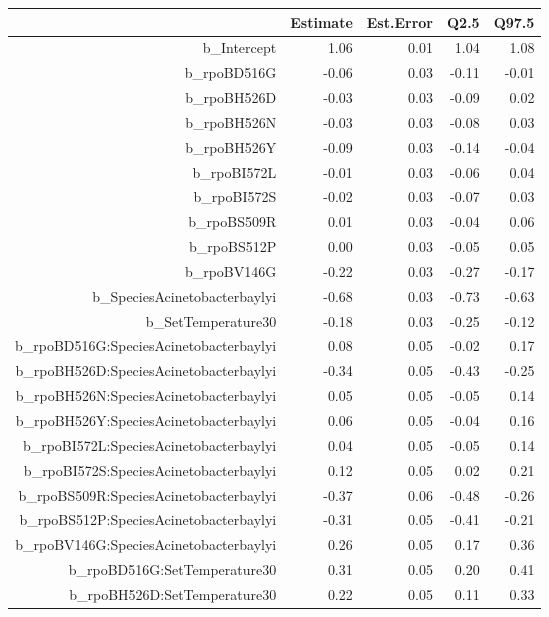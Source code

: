 \begin{table}[ht]
\centering
\begin{tabular}{rrrrr}
  \hline
 & Estimate & Est.Error & Q2.5 & Q97.5 \\ 
  \hline
b\_Intercept & 1.06 & 0.01 & 1.04 & 1.08 \\ 
  b\_rpoBD516G & -0.06 & 0.03 & -0.11 & -0.01 \\ 
  b\_rpoBH526D & -0.03 & 0.03 & -0.09 & 0.02 \\ 
  b\_rpoBH526N & -0.03 & 0.03 & -0.08 & 0.03 \\ 
  b\_rpoBH526Y & -0.09 & 0.03 & -0.14 & -0.04 \\ 
  b\_rpoBI572L & -0.01 & 0.03 & -0.06 & 0.04 \\ 
  b\_rpoBI572S & -0.02 & 0.03 & -0.07 & 0.03 \\ 
  b\_rpoBS509R & 0.01 & 0.03 & -0.04 & 0.06 \\ 
  b\_rpoBS512P & 0.00 & 0.03 & -0.05 & 0.05 \\ 
  b\_rpoBV146G & -0.22 & 0.03 & -0.27 & -0.17 \\ 
  b\_SpeciesAcinetobacterbaylyi & -0.68 & 0.03 & -0.73 & -0.63 \\ 
  b\_SetTemperature30 & -0.18 & 0.03 & -0.25 & -0.12 \\ 
  b\_rpoBD516G:SpeciesAcinetobacterbaylyi & 0.08 & 0.05 & -0.02 & 0.17 \\ 
  b\_rpoBH526D:SpeciesAcinetobacterbaylyi & -0.34 & 0.05 & -0.43 & -0.25 \\ 
  b\_rpoBH526N:SpeciesAcinetobacterbaylyi & 0.05 & 0.05 & -0.05 & 0.14 \\ 
  b\_rpoBH526Y:SpeciesAcinetobacterbaylyi & 0.06 & 0.05 & -0.04 & 0.16 \\ 
  b\_rpoBI572L:SpeciesAcinetobacterbaylyi & 0.04 & 0.05 & -0.05 & 0.14 \\ 
  b\_rpoBI572S:SpeciesAcinetobacterbaylyi & 0.12 & 0.05 & 0.02 & 0.21 \\ 
  b\_rpoBS509R:SpeciesAcinetobacterbaylyi & -0.37 & 0.06 & -0.48 & -0.26 \\ 
  b\_rpoBS512P:SpeciesAcinetobacterbaylyi & -0.31 & 0.05 & -0.41 & -0.21 \\ 
  b\_rpoBV146G:SpeciesAcinetobacterbaylyi & 0.26 & 0.05 & 0.17 & 0.36 \\ 
  b\_rpoBD516G:SetTemperature30 & 0.31 & 0.05 & 0.20 & 0.41 \\ 
  b\_rpoBH526D:SetTemperature30 & 0.22 & 0.05 & 0.11 & 0.33 \\ 

\end{tabular}
\end{table}
